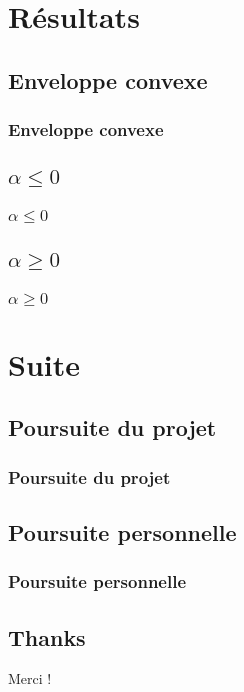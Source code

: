 \documentclass{beamer}
\begin{document}
\section{Résultats}

\subsection{Enveloppe convexe}
\begin{frame}
\frametitle{Enveloppe convexe}
\end{frame}

\subsection{$\alpha \leq 0$}
\begin{frame}
\frametitle{$\alpha \leq 0$}
\end{frame}

\subsection{$\alpha \geq 0$}
\begin{frame}
\frametitle{$\alpha \geq 0$}
\end{frame}

\section{Suite}

\subsection{Poursuite du projet}
\begin{frame}
\frametitle{Poursuite du projet}
\end{frame}

\subsection{Poursuite personnelle}
\begin{frame}
\frametitle{Poursuite personnelle}


\end{frame}

\subsection{Thanks}
\begin{frame}
  \begin{block}{}
    \begin{center}
      Merci !
    \end{center}
  \end{block}
\end{frame}

\end{document}
